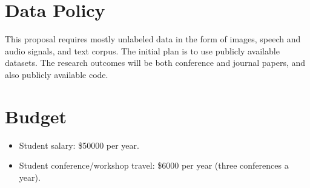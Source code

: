 \documentclass[11pt]{article}
\begin{document}
\section{Data Policy}

This proposal requires mostly unlabeled data in the form of images, speech and audio signals,
and text corpus. The initial plan is to use publicly available datasets.
The research outcomes will be both conference and journal papers, and also publicly available code. 

\section{Budget}

\begin{itemize}
\item Student salary: \$50000 per year.
\item Student conference/workshop travel: \$6000 per year (three conferences a year). 
\end{itemize}

{\small 


}
\end{document}
